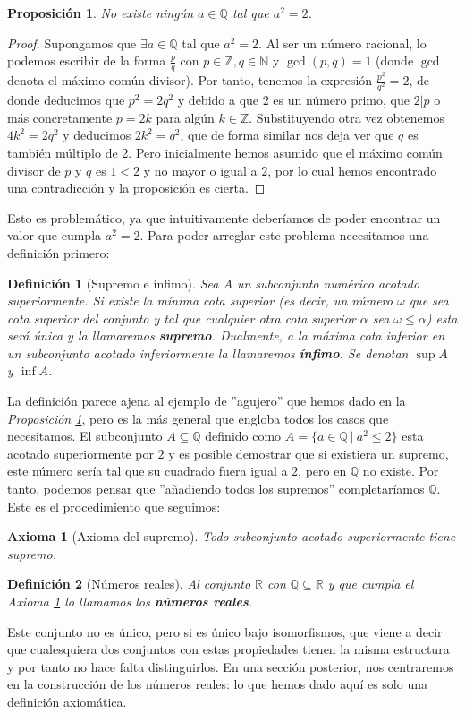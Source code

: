 \documentclass{article}
\newtheorem{prop}{Proposición}
\newtheorem{axiom}{Axioma}
\newtheorem{define}{Definición}
\begin{document}
\begin{prop}\label{prop_2_irrational}
No existe ningún $a \in \mathbb{Q}$ tal que $a^{2} = 2$.
\end{prop}
\begin{proof}
	Supongamos que $\exists a \in \mathbb{Q}$ tal que $a^2 = 2$. Al ser un número racional, lo podemos escribir de la forma $\frac{p}{q}$ con $p\in \mathbb{Z},q\in \mathbb{N}$ y $\gcd(p,q) = 1$ (donde $\gcd$ denota el máximo común divisor). Por tanto, tenemos la expresión $\frac{p^2}{q^2} = 2$, de donde deducimos que $p^2 = 2q^2$ y debido a que $2$ es un número primo, que $2|p$ o más concretamente $p=2k$ para algún $k \in \mathbb{Z}$. Substituyendo otra vez obtenemos $4k^2 = 2q^2$ y deducimos $2k^2 = q^2$, que de forma similar nos deja ver que $q$ es también múltiplo de 2. Pero inicialmente hemos asumido que el máximo común divisor de $p$ y $q$ es $1<2$ y no mayor o igual a $2$, por lo cual hemos encontrado una contradicción y la proposición es cierta.
\end{proof}
Esto es problemático, ya que intuitivamente deberíamos de poder encontrar un valor que cumpla $a^2 = 2$. Para poder arreglar este problema necesitamos una definición primero:

\begin{define}[Supremo e ínfimo]
	Sea $A$ un subconjunto numérico acotado superiormente. Si existe la mínima cota superior (es decir, un número $\omega$ que sea cota superior del conjunto y tal que cualquier otra cota superior $\alpha$ sea $\omega \leq \alpha$) esta será única y la llamaremos \textbf{supremo}. Dualmente, a la máxima cota inferior en un subconjunto acotado inferiormente la llamaremos \textbf{ínfimo}. Se denotan $\sup A$ y $\inf A$.
\end{define}
La definición parece ajena al ejemplo de ''agujero'' que hemos dado en la \textit{Proposición \ref{prop_2_irrational}}, pero es la más general que engloba todos los casos que necesitamos. El subconjunto $A\subseteq \mathbb{Q}$ definido como $A = \{a\in \mathbb{Q}\ |\ a^2 \leq 2\}$ esta acotado superiormente por $2$ y es posible demostrar que si existiera un supremo, este número sería tal que su cuadrado fuera igual a $2$, pero en $\mathbb{Q}$ no existe. Por tanto, podemos pensar que ''añadiendo todos los supremos'' completaríamos $\mathbb{Q}$. Este es el procedimiento que seguimos:
\begin{axiom}[Axioma del supremo] \label{ax_supr}
	Todo subconjunto acotado superiormente tiene supremo.
\end{axiom}
\begin{define}[Números reales]
	Al conjunto $\mathbb{R}$ con $\mathbb{Q} \subseteq \mathbb{R}$ y que cumpla el \textit{Axioma \ref{ax_supr}} lo llamamos los \textbf{números reales}.
\end{define}
Este conjunto no es único, pero si es único bajo isomorfismos, que viene a decir que cualesquiera dos conjuntos con estas propiedades tienen la misma estructura y por tanto no hace falta distinguirlos. En una sección posterior, nos centraremos en la construcción de los números reales: lo que hemos dado aquí es solo una definición axiomática.
\end{document}

